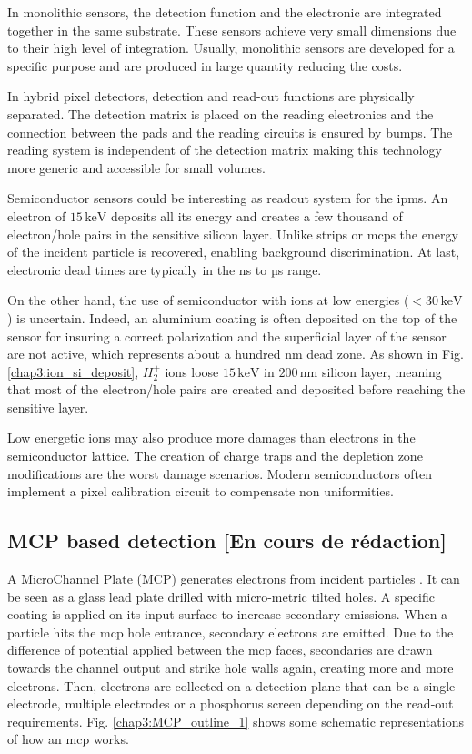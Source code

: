 \begin{refsection}
  In monolithic sensors, the detection function and the electronic are integrated together in the same substrate. These sensors achieve very small dimensions due to their high level of integration. Usually, monolithic sensors are developed for a specific purpose and are produced in large quantity reducing the costs.

  In hybrid pixel detectors, detection and read-out functions are physically separated. The detection matrix is ​​placed on the reading electronics and the connection between the pads and the reading circuits is ensured by bumps. The reading system is independent of the detection matrix making this technology more generic and accessible for small volumes.

  Semiconductor sensors could be interesting as readout system for the \acrshort{ipm}s. An electron of $15\,\mathrm{keV}$ deposits all its energy and creates a few thousand of electron/hole pairs in the sensitive silicon layer. Unlike strips or \acrshort{mcp}s the energy of the incident particle is recovered, enabling background discrimination. At last, electronic dead times are typically in the ns to µs range.

  On the other hand, the use of semiconductor with ions at low energies ($< 30 \,\mathrm{keV}$) is uncertain. Indeed, an aluminium coating is often deposited on the top of the sensor for insuring a correct polarization and the superficial layer of the sensor are not active, which represents about a hundred nm dead zone. As shown in Fig. \ref{chap3:ion_si_deposit}, $H_{2}^{+}$ ions loose $15\,\mathrm{keV}$ in $200\,\mathrm{nm}$ silicon layer, meaning that most of the electron/hole pairs are created and deposited before reaching the sensitive layer.

  Low energetic ions may also produce more damages than electrons in the semiconductor lattice. The creation of charge traps and the depletion zone modifications are the worst damage scenarios. Modern semiconductors often implement a pixel calibration circuit to compensate non uniformities.

  \subsection{MCP based detection  [En cours de rédaction]}

  A MicroChannel Plate (MCP) generates electrons from incident particles \cite{Wiza1979}.
  It can be seen as a glass lead plate drilled with micro-metric tilted holes.
  A specific coating is applied on its input surface to increase secondary emissions. When a particle hits the \acrshort{mcp} hole entrance, secondary electrons are emitted. Due to the difference of potential applied between the \acrshort{mcp} faces, secondaries are drawn towards the channel output and strike hole walls again, creating more and more electrons. Then, electrons are collected on a detection plane that can be a single electrode, multiple electrodes or a phosphorus screen depending on the read-out requirements. Fig. \ref{chap3:MCP_outline_1} shows some schematic representations of how an \acrshort{mcp} works.


\end{refsection}
